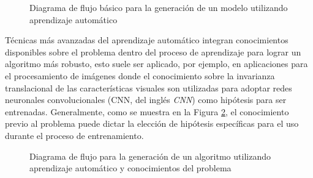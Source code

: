\documentclass[10pt,a4paper]{article}
\begin{document}
\begin{figure}[h!]
    \begin{center}
    \end{center}
    \caption{Diagrama de flujo b\'asico para la generaci\'on de un modelo
    utilizando aprendizaje autom\'atico}
    \label{ml_approach}
\end{figure}

T\'ecnicas m\'as avanzadas del aprendizaje autom\'atico integran conocimientos
disponibles sobre el problema dentro del proceso de aprendizaje para lograr un
algoritmo m\'as robusto, esto suele ser aplicado, por ejemplo, en aplicaciones
para el procesamiento de im\'agenes donde el conocimiento sobre la invarianza
translacional de las caracter\'isticas visuales son utilizadas para adoptar
redes neuronales convolucionales (\acrshort{CNN}, del ingl\'es 
\emph{\acrlong{CNN}}) como hip\'otesis para ser entrenadas. Generalmente, como
se muestra en la Figura \ref{ml_ext_approach}, el conocimiento previo al
problema puede dictar la elecci\'on de hip\'otesis espec\'ificas para el uso
durante el proceso de entrenamiento. 

\begin{figure}[h!]
    \begin{center}
    \end{center}
    \caption{Diagrama de flujo para la generaci\'on de un algoritmo 
    utilizando aprendizaje autom\'atico y conocimientos del problema}
    \label{ml_ext_approach}
\end{figure}
\FloatBarrier
\end{document}
